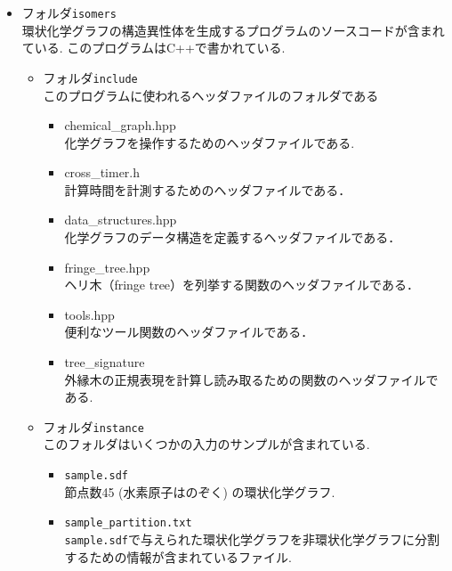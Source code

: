 \documentclass[11pt,titlepage,dvipdfmx,twoside]{jarticle}
\begin{document}
\begin{itemize}
\item フォルダ{\tt isomers}\\
環状化学グラフの構造異性体を生成するプログラムのソースコードが含まれている.
	このプログラムはC++で書かれている.
	\begin{itemize}
	\item フォルダ{\tt include}\\
  このプログラムに使われるヘッダファイルのフォルダである
  		\begin{itemize}

      \item{chemical\_graph.hpp}\\
			  化学グラフを操作するためのヘッダファイルである.
        
      \item{cross\_timer.h}\\
				計算時間を計測するためのヘッダファイルである．
				
			\item{data\_structures.hpp}\\
				化学グラフのデータ構造を定義するヘッダファイルである． 

			\item{fringe\_tree.hpp}\\
				ヘリ木（fringe tree）\cite{branch}を列挙する関数のヘッダファイルである．
				
			\item{tools.hpp}\\
				便利なツール関数のヘッダファイルである．
				
				
			\item{tree\_signature}\\
			外縁木の正規表現を計算し読み取るための関数のヘッダファイルである.
					
		\end{itemize}
	\item フォルダ{\tt instance}\\
		このフォルダはいくつかの入力のサンプルが含まれている.
		\begin{itemize}
			\item{\tt sample.sdf}\\
			 節点数45 (水素原子はのぞく) の環状化学グラフ.

			\item{\tt sample\_partition.txt}\\
      {\tt sample.sdf}で与えられた環状化学グラフを非環状化学グラフに分割するための情報が含まれているファイル.


\end{itemize}
\end{itemize}
\end{itemize}
\end{document}
